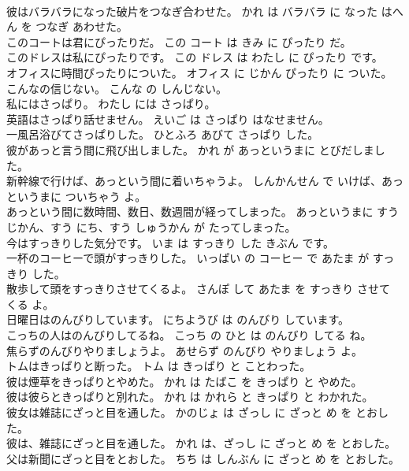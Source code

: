 \documentclass[8pt]{extreport}
\begin{document}
\begin{CJK}{UTF8}{min}
\\	彼はバラバラになった破片をつなぎ合わせた。	かれ は バラバラ に なった はへん を つなぎ あわせた。	
\\	このコートは君にぴったりだ。	この コート は きみ に ぴったり だ。	
\\	このドレスは私にぴったりです。	この ドレス は わたし に ぴったり です。	
\\	オフィスに時間ぴったりについた。	オフィス に じかん ぴったり に ついた。	
\\	こんなの信じない。	こんな の しんじない。	
\\	私にはさっぱり。	わたし には さっぱり。	
\\	英語はさっぱり話せません。	えいご は さっぱり はなせません。	
\\	一風呂浴びてさっぱりした。	ひとふろ あびて さっぱり した。	
\\	彼があっと言う間に飛び出しました。	かれ が あっというまに とびだしました。	
\\	新幹線で行けば、あっという間に着いちゃうよ。	しんかんせん で いけば、あっというまに ついちゃう よ。	
\\	あっという間に数時間、数日、数週間が経ってしまった。	あっというまに すう じかん、すう にち、すう しゅうかん が たってしまった。	
\\	今はすっきりした気分です。	いま は すっきり した きぶん です。	
\\	一杯のコーヒーで頭がすっきりした。	いっぱい の コーヒー で あたま が すっきり した。	
\\	散歩して頭をすっきりさせてくるよ。	さんぽ して あたま を すっきり させて くる よ。	
\\	日曜日はのんびりしています。	にちようび は のんびり しています。	
\\	こっちの人はのんびりしてるね。	こっち の ひと は のんびり してる ね。	
\\	焦らずのんびりやりましょうよ。	あせらず のんびり やりましょう よ。	
\\	トムはきっぱりと断った。	トム は きっぱり と ことわった。	
\\	彼は煙草をきっぱりとやめた。	かれ は たばこ を きっぱり と やめた。	
\\	彼は彼らときっぱりと別れた。	かれ は かれら と きっぱり と わかれた。	
\\	彼女は雑誌にざっと目を通した。	かのじょ は ざっし に ざっと め を とおした。	
\\	彼は、雑誌にざっと目を通した。	かれ は、ざっし に ざっと め を とおした。	
\\	父は新聞にざっと目をとおした。	ちち は しんぶん に ざっと め を とおした。	

\end{CJK}
\end{document}
